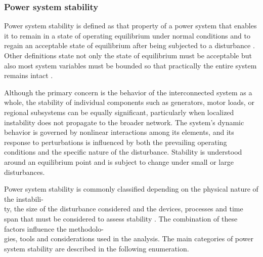 
\subsubsection{Power system stability}

Power system stability is defined as that property of a power system that enables it to 
remain in a state of operating equilibrium under normal conditions and to regain an acceptable 
state of equilibrium after being subjected to a disturbance \cite{StabilityAndControlKundur}. Other definitions
state not only the state of equilibrium must be acceptable but also most system variables must be 
bounded so that practically the entire system remains intact \cite{KundurDef}.


Although the primary concern is the behavior of the interconnected system as a whole, the stability of individual
components such as generators, motor loads, or regional subsystems can be equally significant, particularly when 
localized instability does not propagate to the broader network. The system's dynamic behavior is governed by nonlinear 
interactions among its elements, and its response to perturbations is influenced by both the prevailing operating conditions
and the specific nature of the disturbance. Stability is understood around an equilibrium point and is subject to change
under small or large disturbances.

Power system stability is commonly classified depending on the physical nature of the instabili-\\ty, the size of the disturbance 
considered and the devices, processes and time span that must be considered to assess stability \cite{KundurDef}.
The combination of these factors influence the methodolo-\\gies, tools and considerations used in the analysis. The main categories of power system stability are 
described in the following enumeration.

